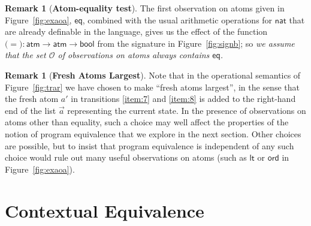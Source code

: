 \documentclass{LMCS}
\theoremstyle{plain}
\theoremstyle{definition}
\newtheorem{remark}[thm]{Remark}
\newcommand{\atm}[1][a]{#1}
\newcommand{\ATM}{\kw{atm}}
\newcommand{\BOOL}{\kw{bool}}
\newcommand{\EQ}{\mathbin{\kw{=}}}
\newcommand{\FUNTY}{\mathbin{\rightarrow}}
\newcommand{\LP}{\mathopen{\kw{(}}}
\newcommand{\kw}[1]{\mathsf{#1}}
\newcommand{\NAT}{\kw{nat}}
\newcommand{\Obs}{\mathcal{O}}
\newcommand{\OBS}[1][obs]{\kw{#1}}
\newcommand{\OFTY}{\mathrel{\kw{:}}}
\newcommand{\RP}{\mathclose{\kw{)}}}
\newcommand{\s}[1][a]{\vec{#1}}
\begin{document}
\begin{remark}[\textbf{Atom-equality test}]
  \label{rem:atoet}
  The first observation on atoms given in Figure~\ref{fig:exaoa},
  $\OBS[eq]$, combined with the usual arithmetic operations for $\NAT$
  that are already definable in the language, gives us the effect of
  the function $\LP\EQ\RP\OFTY\ATM\FUNTY\ATM\FUNTY\BOOL$ from the
  signature in Figure~\ref{fig:signb}; so \emph{we assume that the set
  $\Obs$ of observations on atoms always contains $\OBS[eq]$.}
\end{remark}

\begin{remark}[\textbf{Fresh Atoms Largest}]
  \label{rem:freal}
  Note that in the operational semantics of Figure~\ref{fig:trar} we
  have chosen to make ``fresh atoms largest'', in the sense that the
  fresh atom $\atm'$ in transitions \ref{item:7} and \ref{item:8} is
  added to the right-hand end of the list $\s$ representing the current
  state. In the presence of observations on atoms other than equality,
  such a choice may well affect the properties of the notion of
  program equivalence that we explore in the next section. Other
  choices are possible, but to insist that program equivalence is
  independent of any such choice would rule out many useful
  observations on atoms (such as $\OBS[lt]$ or $\OBS[ord]$ in
  Figure~\ref{fig:exaoa}).
\end{remark}

\section{Contextual Equivalence}
\label{sec:cont-equiv}
\end{document}
